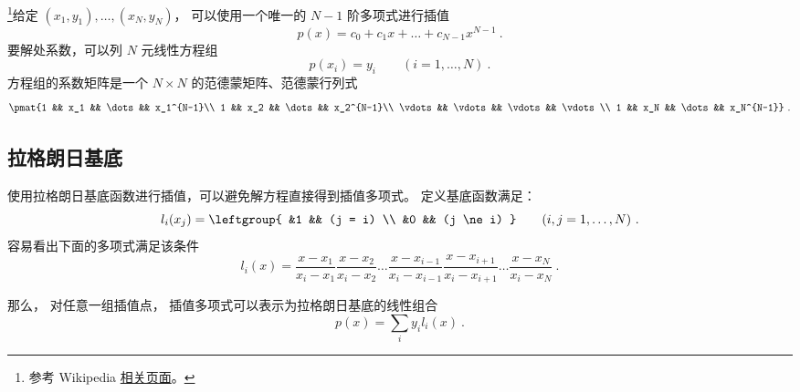 

\footnote{参考 Wikipedia \href{https://en.wikipedia.org/wiki/Lagrange_polynomial}{相关页面}。}给定 $(x_1, y_1), \dots, (x_N, y_N)$， 可以使用一个唯一的 $N-1$ 阶多项式进行插值
\begin{equation}
p(x) = c_0 + c_1x + \dots + c_{N-1}x^{N-1}~.
\end{equation}
要解处系数，可以列 $N$ 元线性方程组
\begin{equation}
p(x_i) = y_i \qquad (i=1,\dots,N)~.
\end{equation}
方程组的系数矩阵是一个 $N\times N$ 的范德蒙矩阵、范德蒙行列式
\begin{equation}
\pmat{1 && x_1 && \dots && x_1^{N-1}\\
1 && x_2 && \dots && x_2^{N-1}\\
\vdots && \vdots && \vdots && \vdots \\
1 && x_N && \dots && x_N^{N-1}}~.
\end{equation}

\subsection{拉格朗日基底}
使用拉格朗日基底函数进行插值，可以避免解方程直接得到插值多项式。 定义基底函数满足：
\begin{equation}
l_i(x_j) = \leftgroup{
&1 && (j = i) \\
&0 && (j \ne i)
} \qquad (i,j=1,\dots,N)~.
\end{equation}
容易看出下面的多项式满足该条件
\begin{equation}
l_i(x) = \frac{x-x_1}{x_i-x_1} \frac{x-x_2}{x_i-x_2}  \dots \frac{x-x_{i-1}}{x_i-x_{i-1}}\frac{x-x_{i+1}}{x_i-x_{i+1}} \dots \frac{x-x_N}{x_i-x_N}~.
\end{equation}

那么， 对任意一组插值点， 插值多项式可以表示为拉格朗日基底的线性组合
\begin{equation}
p(x) = \sum_i y_i l_i(x)~.
\end{equation}
